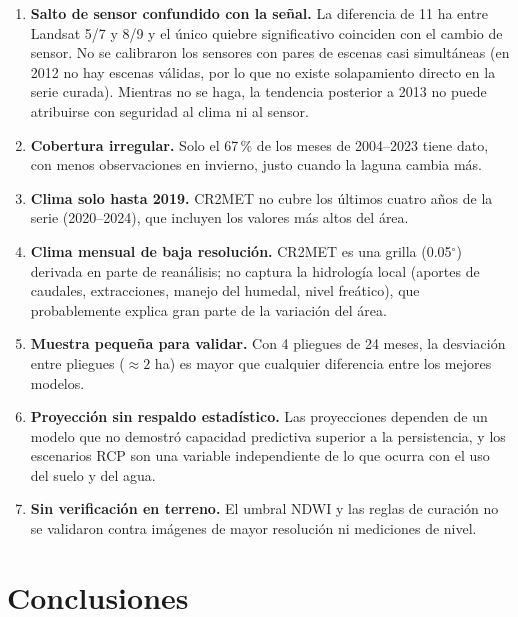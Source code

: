 \documentclass[11pt,a4paper]{article}
\begin{document}
\begin{enumerate}
\item \textbf{Salto de sensor confundido con la señal.} La diferencia de 11 ha entre Landsat 5/7 y 8/9 y el único quiebre significativo coinciden con el cambio de sensor. No se calibraron los sensores con pares de escenas casi simultáneas (en 2012 no hay escenas válidas, por lo que no existe solapamiento directo en la serie curada). Mientras no se haga, la tendencia posterior a 2013 no puede atribuirse con seguridad al clima ni al sensor.
\item \textbf{Cobertura irregular.} Solo el 67\,\% de los meses de 2004--2023 tiene dato, con menos observaciones en invierno, justo cuando la laguna cambia más.
\item \textbf{Clima solo hasta 2019.} CR2MET no cubre los últimos cuatro años de la serie (2020--2024), que incluyen los valores más altos del área.
\item \textbf{Clima mensual de baja resolución.} CR2MET es una grilla (0.05$^\circ$) derivada en parte de reanálisis; no captura la hidrología local (aportes de caudales, extracciones, manejo del humedal, nivel freático), que probablemente explica gran parte de la variación del área.
\item \textbf{Muestra pequeña para validar.} Con 4 pliegues de 24 meses, la desviación entre pliegues (${\approx}2$ ha) es mayor que cualquier diferencia entre los mejores modelos.
\item \textbf{Proyección sin respaldo estadístico.} Las proyecciones dependen de un modelo que no demostró capacidad predictiva superior a la persistencia, y los escenarios RCP son una variable independiente de lo que ocurra con el uso del suelo y del agua.
\item \textbf{Sin verificación en terreno.} El umbral NDWI y las reglas de curación no se validaron contra imágenes de mayor resolución ni mediciones de nivel.
\end{enumerate}

\section{Conclusiones}
\end{document}
